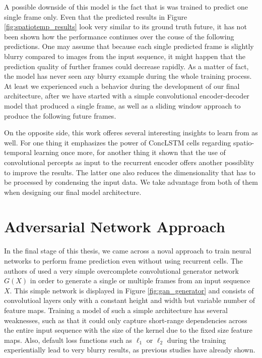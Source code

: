 A possible downside of this model is the fact that is was trained to predict one single frame only. Even that the predicted results in Figure \ref{fig:spatiotemp_results} look very similar to its ground truth future, it has not been shown how the performance continues over the couse of the following predictions. One may assume that because each single predicted frame is slightly blurry compared to images from the input sequence, it might happen that the prediction quality of further frames could decrease rapidly. As a matter of fact, the model has never seen any blurry example during the whole training process. At least we experienced such a behavior during the development of our final architecture, after we have started with a simple convolutional encoder-decoder model that produced a single frame, as well as a sliding window approach to produce the following future frames.

On the opposite side, this work offeres several interesting insights to learn from as well. For one thing it emphasizes the power of ConcLSTM cells regarding spatio-temporal learning once more, for another thing it shown that the use of convolutional percepts as input to the recurrent encoder offers another possiblity to improve the results. The latter one also reduces the dimensionality that has to be processed by condensing the input data. We take advantage from both of them when designing our final model architecture.


\section{Adversarial Network Approach}

In the final stage of this thesis, we came across a noval approach to train neural networks to perform frame prediction even without using recurrent cells. The authors of \parencite{deep_multiscale_video_pred} used a very simple overcomplete convolutional generator network $ G(X) $ in order to generate a single or multiple frames from an input sequence $ X $. This simple network is displayed in Figure \ref{fig:gan_generator} and consists of convolutioal layers only with a constant height and width but variable number of feature maps. Training a model of such a simple architecture has several weaknesses, such as that it could only capture short-range dependencies across the entire input sequence with the size of the kernel due to the fixed size feature maps. Also, default loss functions such as $\ell_1$ or $\ell_2$ during the training experientially lead to very blurry results, as previous studies have already shown.

